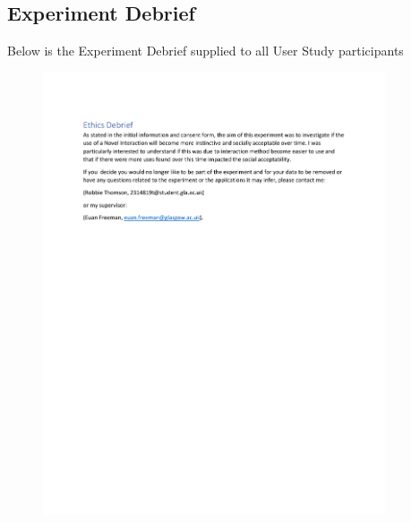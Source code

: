 \documentclass{l4proj}
\begin{document}
\begin{appendices}
\chapter{Experiment Debrief}
Below is the Experiment Debrief supplied to all User Study participants
\begin{figure}[!htb]
    \centering
    \includegraphics[width=0.9\textwidth]{images/Ethics Debrief.pdf}
\end{figure}



\end{appendices}
\end{document}
